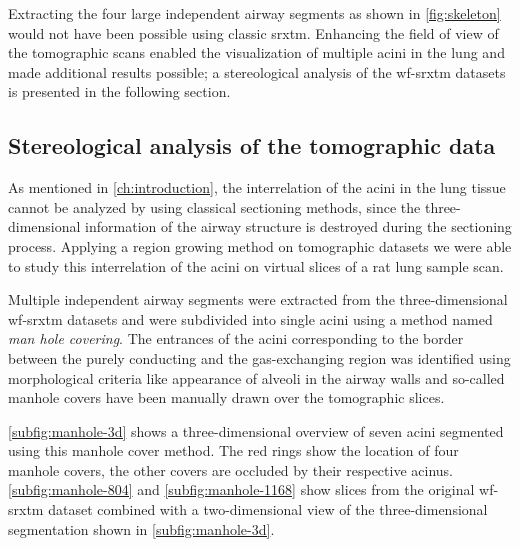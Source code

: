 Extracting the four large independent airway segments as shown in \autoref{fig:skeleton} would not have been possible using classic \ac{srxtm}. Enhancing the field of view of the tomographic scans enabled the visualization of multiple acini in the lung and made additional results possible; a stereological analysis of the \ac{wf-srxtm} datasets is presented in the following section.

\subsection{Stereological analysis of the tomographic data\label{subsec:stereological analysis}}
As mentioned in \autoref{ch:introduction}, the interrelation of the acini in the lung tissue cannot be analyzed by using classical sectioning methods, since the three-dimensional information of the airway structure is destroyed during the sectioning process. Applying a region growing method on tomographic datasets we were able to study this interrelation of the acini on virtual slices of a rat lung sample scan.

Multiple independent airway segments were extracted from the three-dimensional \ac{wf-srxtm} datasets and were subdivided into single acini using a method named \emph{man hole covering}. The entrances of the acini corresponding to the border between the purely conducting and the gas-exchanging region was identified using morphological criteria like appearance of alveoli in the airway walls and so-called manhole covers have been manually drawn over the tomographic slices. 

\autoref{subfig:manhole-3d} shows a three-dimensional overview of seven acini segmented using this manhole cover method. The red rings show the location of four manhole covers, the other covers are occluded by their respective acinus. \autoref{subfig:manhole-804} and \ref{subfig:manhole-1168} show slices from the original \ac{wf-srxtm} dataset combined with a two-dimensional view of the three-dimensional segmentation shown in \autoref{subfig:manhole-3d}.

